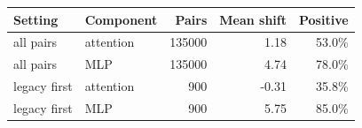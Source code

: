 \begin{tabular}{llrrr}
\toprule
Setting & Component & Pairs & Mean shift & Positive \\
\midrule
all pairs & attention & 135000 & 1.18 & 53.0\% \\
all pairs & MLP & 135000 & 4.74 & 78.0\% \\
legacy first & attention & 900 & -0.31 & 35.8\% \\
legacy first & MLP & 900 & 5.75 & 85.0\% \\
\bottomrule
\end{tabular}

